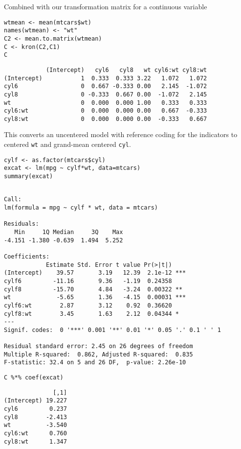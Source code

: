 \documentclass[]{article}
\begin{document}
Combined with our transformation matrix for a continuous variable

\begin{verbatim}
wtmean <- mean(mtcars$wt)
names(wtmean) <- "wt"
C2 <- mean.to.matrix(wtmean)
C <- kron(C2,C1)
C
\end{verbatim}

\begin{verbatim}
            (Intercept)   cyl6   cyl8   wt cyl6:wt cyl8:wt
(Intercept)           1  0.333  0.333 3.22   1.072   1.072
cyl6                  0  0.667 -0.333 0.00   2.145  -1.072
cyl8                  0 -0.333  0.667 0.00  -1.072   2.145
wt                    0  0.000  0.000 1.00   0.333   0.333
cyl6:wt               0  0.000  0.000 0.00   0.667  -0.333
cyl8:wt               0  0.000  0.000 0.00  -0.333   0.667
\end{verbatim}

This converts an uncentered model with reference coding for the
indicators to centered \texttt{wt} and grand-mean centered \texttt{cyl}.

\begin{verbatim}
cylf <- as.factor(mtcars$cyl)
excat <- lm(mpg ~ cylf*wt, data=mtcars)
summary(excat)
\end{verbatim}

\begin{verbatim}

Call:
lm(formula = mpg ~ cylf * wt, data = mtcars)

Residuals:
   Min     1Q Median     3Q    Max 
-4.151 -1.380 -0.639  1.494  5.252 

Coefficients:
            Estimate Std. Error t value Pr(>|t|)    
(Intercept)    39.57       3.19   12.39  2.1e-12 ***
cylf6         -11.16       9.36   -1.19  0.24358    
cylf8         -15.70       4.84   -3.24  0.00322 ** 
wt             -5.65       1.36   -4.15  0.00031 ***
cylf6:wt        2.87       3.12    0.92  0.36620    
cylf8:wt        3.45       1.63    2.12  0.04344 *  
---
Signif. codes:  0 '***' 0.001 '**' 0.01 '*' 0.05 '.' 0.1 ' ' 1

Residual standard error: 2.45 on 26 degrees of freedom
Multiple R-squared:  0.862, Adjusted R-squared:  0.835 
F-statistic: 32.4 on 5 and 26 DF,  p-value: 2.26e-10
\end{verbatim}

\begin{verbatim}
C %*% coef(excat)
\end{verbatim}

\begin{verbatim}
              [,1]
(Intercept) 19.227
cyl6         0.237
cyl8        -2.413
wt          -3.540
cyl6:wt      0.760
cyl8:wt      1.347
\end{verbatim}
\end{document}
